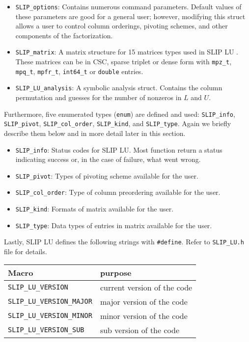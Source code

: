 \documentclass[12pt]{article}
\theoremstyle{definition}
\begin{document}
\begin{itemize}
    \item \verb|SLIP_options|: Contains numerous command parameters. Default
    values of these parameters are good for a general user; however, modifying
    this struct allows a user to control column orderings, pivoting schemes,
    and other components of the factorization.

    \item \verb|SLIP_matrix|: A matrix structure for 15 matrices types used
    in SLIP LU . These matrices can be in CSC, sparse triplet or dense form
    with \verb|mpz_t|, \verb|mpq_t|, \verb|mpfr_t|, \verb|int64_t| or
    \verb|double| entries.

    \item \verb|SLIP_LU_analysis|: A symbolic analysis struct. Contains the
    column permutation and guesses for the number of nonzeros in $L$ and $U$.
\end{itemize}

Furthermore, five enumerated types (\verb|enum|) are defined and used:
\verb|SLIP_info|, \verb|SLIP_pivot|, \verb|SLIP_col_order|, \verb|SLIP_kind|,
and \verb|SLIP_type|. Again we briefly
describe them below and in more detail later in this section.

\begin{itemize}
    \item \verb|SLIP_info|: Status codes for SLIP LU. Most function return
    a status indicating success or, in the case of failure, what went wrong.
    \item \verb|SLIP_pivot|: Types of pivoting scheme available for the user.
    \item \verb|SLIP_col_order|: Type of column preordering available for the
    user.
    \item \verb|SLIP_kind|: Formats of matrix available for the user.
    \item \verb|SLIP_type|: Data types of entries in matrix available for the user.
\end{itemize}

Lastly, SLIP LU defines the following strings with \verb|#define|. Refer to
\verb|SLIP_LU.h| file for details.

\begin{center}
\begin{tabular}{ll}
\hline
Macro & purpose \\
\hline
\verb|SLIP_LU_VERSION|       &  current version of the code\\
\verb|SLIP_LU_VERSION_MAJOR| &  major version of the code\\
\verb|SLIP_LU_VERSION_MINOR| & minor version of the code   \\
\verb|SLIP_LU_VERSION_SUB|   &  sub version of the code\\
\hline
\end{tabular}
\end{center}
\end{document}
